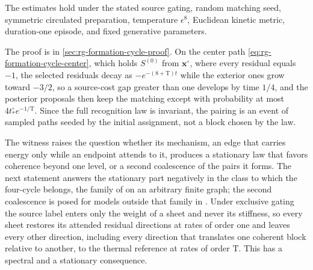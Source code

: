 The estimates hold under the stated source gating, random matching seed,
symmetric circulated preparation, temperature \(\epsilon^8\), Euclidean
kinetic metric, duration-one episode, and fixed generative parameters.

The proof is in \cref{sec:rg-formation-cycle-proof}. On the center path
\cref{eq:rg-formation-cycle-center}, which holds \(S^{(0)}\) from
\(\mathbf x^\circ\), where every residual equals \(-1\), the selected
residuals decay as \(-e^{-(8+\mathrm T)t}\) while the exterior ones grow
toward \(-3/2\), so a source-cost gap greater than one develops by time
\(1/4\), and the posterior proposals then keep the matching except with
probability at most \(4t^\circ_*e^{-1/\mathrm T}\). Since the full
recognition law is invariant, the pairing is an event of sampled paths seeded
by the initial assignment, not a block chosen by the law.

The witness raises the question whether its mechanism, an edge that carries
energy only while an endpoint attends to it, produces a stationary law that
favors coherence beyond one level, or a second coalescence of the pairs it
forms. The next statement answers the stationary part negatively in the
class to which the four-cycle belongs, the family of
 on an arbitrary finite graph; the
second coalescence is posed for models outside that family in
. Under exclusive gating the source label
enters only the weight of a sheet and never its stiffness, so every sheet
restores its attended residual directions at rates of order one and leaves
every other direction, including every direction that translates one
coherent block relative to another, to the thermal reference at rates of
order \(\mathrm T\). This has a spectral and a stationary consequence.

